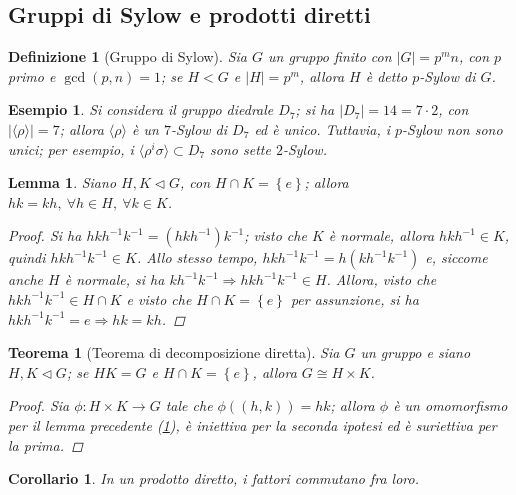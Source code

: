 \documentclass[11pt]{scrartcl}
\theoremstyle{style1}
\newtheorem{teorema}{Teorema}[section]
\newtheorem{corollario}{Corollario}[teorema]
\newtheorem{lemma}{Lemma}[teorema]
\newtheorem{definizione}{Definizione}[section]
\newtheorem{esempio}{Esempio}[section]
\numberwithin{equation}{subsection}
\begin{document}
\subsection{Gruppi di Sylow e prodotti diretti}
\begin{definizione}
	[Gruppo di Sylow]
	Sia $G$ un gruppo finito con $\lvert G \rvert = p^m n$, con $p$ primo e $\operatorname{gcd}(p,n) =1$; se $H < G$ e $\lvert H \rvert = p^m$, allora $H$ \`e detto $p$-Sylow di $G$.
\end{definizione}
\begin{esempio}
Si considera il gruppo diedrale $D_7$; si ha $\lvert D_7 \rvert = 14 = 7 \cdot 2$, con $\lvert \langle \rho  \rangle \rvert = 7$; allora $\langle \rho  \rangle$ \`e un $7$-Sylow di $D_7$ ed \`e unico.
Tuttavia, i $p$-Sylow non sono unici; per esempio, i $\langle \rho ^i \sigma \rangle\subset D_7$ sono sette $2$-Sylow.
\end{esempio}
\begin{lemma}\label{lemprec161}
	Siano $H,K\lhd G$, con $H \cap K = \left\{ e \right\} $; allora $hk = kh, \ \forall h\in H, \ \forall k \in K$.
	\begin{proof}
		Si ha $hkh^{-1}k^{-1}= (hkh^{-1})k^{-1}$; visto che $K$ \`e normale, allora $hkh^{-1}\in K$, quindi $hkh^{-1}k^{-1}\in K$.
		Allo stesso tempo, $hkh^{-1}k^{-1}= h(kh^{-1}k^{-1})$ e, siccome anche $H$ \`e normale, si ha $kh^{-1}k^{-1}\Rightarrow hkh^{-1}k^{-1}\in H$.
		Allora, visto che $hkh^{-1}k^{-1}\in H\cap K$ e visto che $H\cap K = \left\{ e \right\} $ per assunzione, si ha $hkh^{-1}k^{-1}=e \Rightarrow hk=kh$.
	\end{proof}
\end{lemma}
\begin{teorema}[Teorema di decomposizione diretta]\label{t171}
	Sia $G$ un gruppo e siano $H,K \lhd G$; se $HK = G$ e $H\cap K = \left\{ e \right\} $, allora $G \cong H \times  K$.
	\begin{proof}
		Sia $\phi :H \times  K \to G$ tale che $\phi ((h,k))=hk$; allora $\phi $ \`e un omomorfismo per il lemma precedente (\ref{lemprec161}), \`e iniettiva per la seconda ipotesi ed \`e suriettiva per la prima.
	\end{proof}
\end{teorema}
\begin{corollario}
	In un prodotto diretto, i fattori commutano fra loro.
\end{corollario}	
\end{document}
